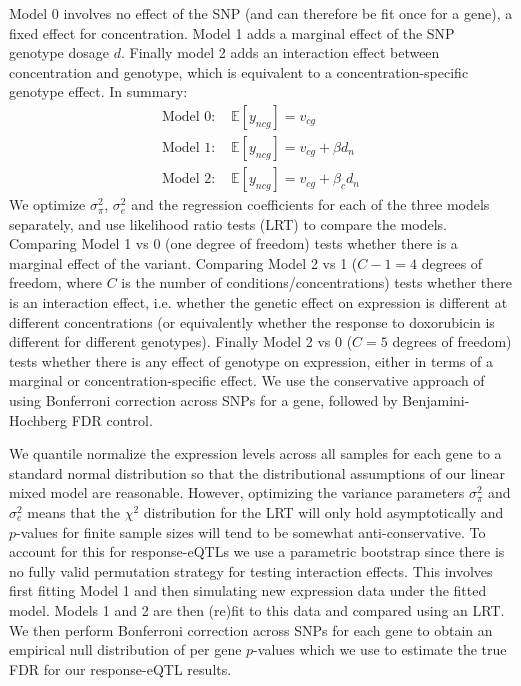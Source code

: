 \documentclass{article}
\begin{document}
{Model 0 involves no effect of the SNP (and can therefore be fit once for a gene), a fixed effect for concentration. Model 1 adds a marginal effect of the SNP genotype dosage $d$. Finally model 2 adds an interaction effect between concentration and genotype, which is equivalent to a concentration-specific genotype effect. In summary: 
\begin{align}
\text{Model 0: }& \mathbb{E}[ y_{ncg} ] = v_{cg} \\ 
\text{Model 1: }& \mathbb{E}[ y_{ncg} ] = v_{cg} + \beta d_n \\
\text{Model 2: }& \mathbb{E}[ y_{ncg} ] = v_{cg} + \beta_c d_n \label{eq:betac}
\end{align}
We optimize $\sigma^2_\pi$, $\sigma^2_e$ and the regression coefficients for each of the three models separately, and use likelihood ratio tests (LRT) to compare the models. Comparing Model 1 vs 0 (one degree of freedom) tests whether there is a marginal effect of the variant. Comparing Model 2 vs 1 ($C-1=4$ degrees of freedom, where $C$ is the number of conditions/concentrations) tests whether there is an interaction effect, i.e. whether the genetic effect on expression is different at different concentrations (or equivalently whether the response to doxorubicin is different for different genotypes). Finally Model 2 vs 0 ($C=5$ degrees of freedom) tests whether there is any effect of genotype on expression, either in terms of a marginal or concentration-specific effect. We use the conservative approach of using Bonferroni correction across SNPs for a gene, followed by Benjamini-Hochberg FDR control. 

We quantile normalize the expression levels across all samples for each gene to a standard normal distribution so that the distributional assumptions of our linear mixed model are reasonable. However, optimizing the variance parameters $\sigma^2_\pi$ and $\sigma^2_e$ means that the $\chi^2$ distribution for the LRT will only hold asymptotically and $p$-values for finite sample sizes will tend to be somewhat anti-conservative. To account for this for response-eQTLs we use a parametric bootstrap since there is no fully valid permutation strategy for testing interaction effects. This involves first fitting Model 1 and then simulating new expression data under the fitted model. Models 1 and 2 are then (re)fit to this data and compared using an LRT. We then perform Bonferroni correction across SNPs for each gene to obtain an empirical null distribution of per gene $p$-values which we use to estimate the true FDR for our response-eQTL results. 

}
\end{document}

